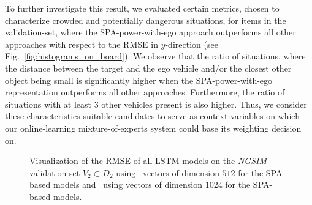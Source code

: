 To further investigate this result, we evaluated certain metrics, chosen to characterize crowded and potentially dangerous situations, for items in the validation-set, where the \ac{SPA}-power-with-ego approach outperforms all other approaches with respect to the \ac{RMSE} in $y$-direction (see Fig.~\ref{fig:histograms_on_board}).
We observe that the ratio of situations, where the distance between the target and the ego vehicle and/or the closest other object being small is significantly higher when the \ac{SPA}-power-with-ego representation outperforms all other approaches.
Furthermore, the ratio of situations with at least \num{3} other vehicles present is also higher.
Thus, we consider these characteristics suitable candidates to serve as context variables on which our online-learning mixture-of-experts system could base its weighting decision on.
\begin{figure}[t!]
	\centering
    \vspace{-0.3cm}

    \caption{Visualization of the \ac{RMSE} of all \ac{LSTM} models on the \emph{\ac{NGSIM}} validation set $V_2 \subset D_2$ using~\protect{} vectors of dimension $512$ for the \ac{SPA}-based models and~\protect{} using vectors of dimension $1024$ for the \ac{SPA}-based models.}\label{fig:rmse_ngsim_all}

\end{figure}

